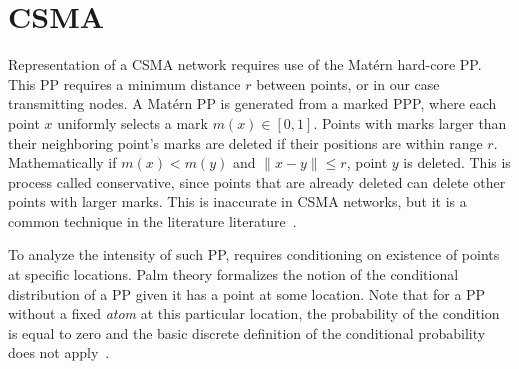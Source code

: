 \documentclass[a4paper]{article}
\begin{document}
\section{CSMA}
%
Representation of a CSMA network requires use of the Mat\'ern hard-core PP.  This PP requires a minimum distance $r$ between points, or in our case transmitting nodes.  A Mat\'ern PP is generated from a marked PPP, where each point $x$ uniformly selects a mark $m(x)\in[0,1]$.  Points with marks larger than their neighboring point's marks are deleted if their positions are within range $r$.  Mathematically if $m(x)<m(y)$ and $\|x-y\| \leq r$, point $y$ is deleted.  This is process called conservative, since points that are already deleted can delete other points with larger marks. This is inaccurate in CSMA networks, but it is a common technique in the literature literature~\cite{Nguyen2007}.\par
%
To analyze the intensity of such PP, requires conditioning on existence of points at specific locations.  Palm theory formalizes the notion of the conditional distribution of a PP given it has a point at some location. Note that for a PP without a fixed \textit{atom} at this particular location, the probability of the condition is equal to zero and the basic discrete definition of the conditional probability does not apply~\cite{baccelli2009stochastic}.\par
%
\end{document}
